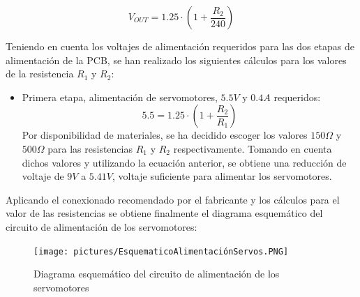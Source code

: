 \begin{equation}
    V_{OUT} = 1.25 \cdot \left( 1 + \frac{R_2}{240}\right) 
\end{equation}

Teniendo en cuenta los voltajes de alimentación requeridos para las dos etapas de alimentación de la \ac{PCB}, se han realizado los siguientes cálculos para los valores de la resistencia $R_1$ y $R_2$:
\begin{itemize}
    \item Primera etapa, alimentación de servomotores, $5.5V$ y $0.4A$ requeridos:
    \begin{equation}
        5.5 = 1.25 \cdot \left( 1 + \frac{R_2}{R_1}\right) 
    \end{equation}
    Por disponibilidad de materiales, se ha decidido escoger los valores $150\Omega$ y $500\Omega$ para las resistencias $R_1$ y $R_2$ respectivamente. Tomando en cuenta dichos valores y utilizando la ecuación anterior, se obtiene una reducción de voltaje de $9V$ a $5.41V$, voltaje suficiente para alimentar los servomotores.
\end{itemize}

Aplicando el conexionado recomendado por el fabricante y los cálculos para el valor de las resistencias se obtiene finalmente el diagrama esquemático del circuito de alimentación de los servomotores:

\begin{figure}[H]
    \centering 
    \texttt{[image: pictures/EsquematicoAlimentaciónServos.PNG]}
    \caption{Diagrama esquemático del circuito de alimentación de los servomotores}
    \label{fig:CAMBIAR!!!!!!!!!!}
\end{figure}

